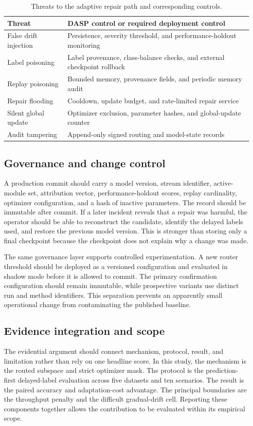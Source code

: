 \begin{table}[t]
\caption{Threats to the adaptive repair path and corresponding controls.}
\label{tab:threat-controls}
\centering
\scriptsize
\begin{tabular}{p{}p{}}
\toprule
Threat & DASP control or required deployment control\\
\midrule
False drift injection & Persistence, severity threshold, and performance-holdout monitoring\\
Label poisoning & Label provenance, class-balance checks, and external checkpoint rollback\\
Replay poisoning & Bounded memory, provenance fields, and periodic memory audit\\
Repair flooding & Cooldown, update budget, and rate-limited repair service\\
Silent global update & Optimizer exclusion, parameter hashes, and global-update counter\\
Audit tampering & Append-only signed routing and model-state records\\
\bottomrule
\end{tabular}
\end{table}

\subsection{Governance and change control}
A production commit should carry a model version, stream identifier, active-module set, attribution vector, performance-holdout scores, replay cardinality, optimizer configuration, and a hash of inactive parameters. The record should be immutable after commit. If a later incident reveals that a repair was harmful, the operator should be able to reconstruct the candidate, identify the delayed labels used, and restore the previous model version. This is stronger than storing only a final checkpoint because the checkpoint does not explain why a change was made.

The same governance layer supports controlled experimentation. A new router threshold should be deployed as a versioned configuration and evaluated in shadow mode before it is allowed to commit. The primary confirmation configuration should remain immutable, while prospective variants use distinct run and method identifiers. This separation prevents an apparently small operational change from contaminating the published baseline.

\subsection{Evidence integration and scope}
The evidential argument should connect mechanism, protocol, result, and limitation rather than rely on one headline score. In this study, the mechanism is the routed subspace and strict optimizer mask. The protocol is the prediction-first delayed-label evaluation across five datasets and ten scenarios. The result is the paired accuracy and adaptation-cost advantage. The principal boundaries are the throughput penalty and the difficult gradual-drift cell. Reporting these components together allows the contribution to be evaluated within its empirical scope.


